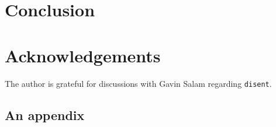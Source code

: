 \documentclass[submission, PhysCodeb]{SciPost}
\begin{document}
\section{Conclusion}
\label{sec:conclusion}

\section*{Acknowledgements}
The author is grateful for discussions with Gavin Salam regarding {\tt disent}. 


\begin{appendix}

  \section{An appendix}

\end{appendix}



\nolinenumbers
\end{document}
